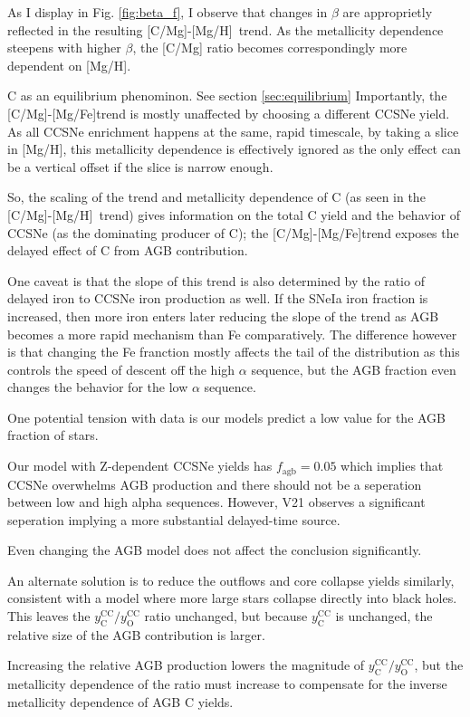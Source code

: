 \documentclass[12pt,oneside]{report}
\newcommand{\caah}{[C/Mg]-[Mg/H]}
\newcommand{\caafe}{[C/Mg]-[Mg/Fe]}
\begin{document}
As I display in Fig. \ref{fig:beta_f}, I observe that changes in $\beta$ are
approprietly reflected in the resulting \caah~trend. As the metallicity
dependence steepens with higher $\beta$, the [C/Mg] ratio becomes
correspondingly more dependent on [Mg/H].

C as an equilibrium phenominon. See section \ref{sec:equilibrium} Importantly, the \caafe trend is mostly unaffected by choosing a different
CCSNe yield. As all CCSNe enrichment happens at the same, rapid timescale, by
taking a slice in [Mg/H], this metallicity dependence is effectively ignored as
the only effect can be a vertical offset if the slice is narrow enough. 

So, the scaling of the trend and metallicity dependence of C (as seen in
the \caah~trend) gives information on the total C yield and the behavior
of CCSNe (as the dominating producer of C);
the \caafe trend exposes the delayed effect of C from AGB contribution.

One caveat is that the slope of this trend is also determined by the ratio of delayed iron to CCSNe iron production as well. If the SNeIa iron fraction is increased, then more iron enters later reducing the slope of the trend as AGB becomes a more rapid mechanism than Fe comparatively. The difference however is that changing the Fe franction mostly affects the tail of the distribution as this controls the speed of descent off the high $\alpha$ sequence, but the AGB fraction even changes the behavior for the low $\alpha$ sequence.

One potential tension with data is our models predict a low value for the AGB fraction of stars. 

Our model with Z-dependent CCSNe yields has $f_\text{agb} = 0.05$ which implies that CCSNe overwhelms AGB production and there should not be a seperation between low and high alpha sequences. However, V21 observes a significant seperation implying a more substantial delayed-time source. 

Even changing the AGB model does not affect the conclusion significantly. 

An alternate solution is to reduce the outflows and core collapse yields similarly, consistent with a model where more large stars collapse directly into black holes. This leaves the $y_\text{C}^\text{CC}/y_\text{O}^\text{CC}$ ratio unchanged, but because $y_\text{C}^\text{CC}$ is unchanged, the relative size of the AGB contribution is larger. 


Increasing the relative AGB production lowers the magnitude of  $y_\text{C}^\text{CC}/y_\text{O}^\text{CC}$, but the metallicity dependence of the ratio must increase to compensate for the inverse metallicity dependence of AGB C yields. 
\end{document}
